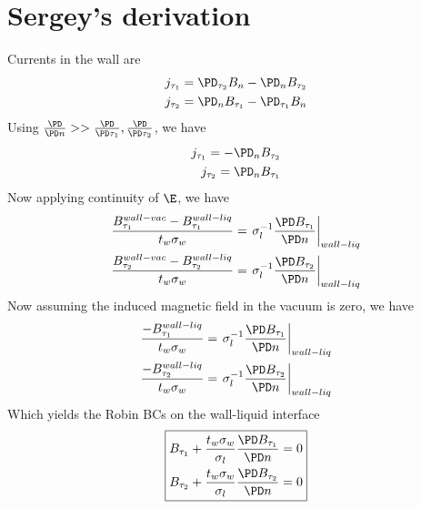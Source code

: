 \documentclass[11pt]{article}
\begin{document}
\newpage

\section{Sergey's derivation}
Currents in the wall are
\begin{equation} \begin{aligned}
  j_{\tau_1} = \PD_{\tau_2} B_n - \PD_n B_{\tau_2} \\
  j_{\tau_2} = \PD_n B_{\tau_1} - \PD_{\tau_1} B_n
\end{aligned} \end{equation}
Using $\frac{\PD}{\PD n} >> \frac{\PD}{\PD \tau_1},\frac{\PD}{\PD \tau_2}$, we have
\begin{equation} \begin{aligned}
  j_{\tau_1} =-\PD_n B_{\tau_2} \\
  j_{\tau_2} = \PD_n B_{\tau_1}
\end{aligned} \end{equation}
Now applying continuity of $\E$, we have
\begin{equation} \begin{aligned}
  \frac{B_{\tau_1}^{wall-vac}-B_{\tau_1}^{wall-liq}}{t_w \sigma_w}=\left. \sigma_l^{-1}\frac{\PD B_{\tau_1}}{\PD n} \right|_{wall-liq} \\
  \frac{B_{\tau_2}^{wall-vac}-B_{\tau_2}^{wall-liq}}{t_w \sigma_w}=\left. \sigma_l^{-1}\frac{\PD B_{\tau_2}}{\PD n} \right|_{wall-liq}
\end{aligned} \end{equation}
Now assuming the induced magnetic field in the vacuum is zero, we have
\begin{equation} \begin{aligned}
  \frac{-B_{\tau_1}^{wall-liq}}{t_w \sigma_w}= \left. \sigma_l^{-1}\frac{\PD B_{\tau_1}}{\PD n} \right|_{wall-liq} \\
  \frac{-B_{\tau_2}^{wall-liq}}{t_w \sigma_w}= \left. \sigma_l^{-1}\frac{\PD B_{\tau_2}}{\PD n} \right|_{wall-liq}
\end{aligned} \end{equation}
Which yields the Robin BCs on the wall-liquid interface
\begin{equation}
\boxed{
\begin{aligned}
  B_{\tau_1} + \frac{t_w \sigma_w}{\sigma_l} \frac{\PD B_{\tau_1} }{\PD n} = 0 \\
  B_{\tau_2} + \frac{t_w \sigma_w}{\sigma_l} \frac{\PD B_{\tau_2} }{\PD n} = 0
\end{aligned}
}
\end{equation}
\end{document}
